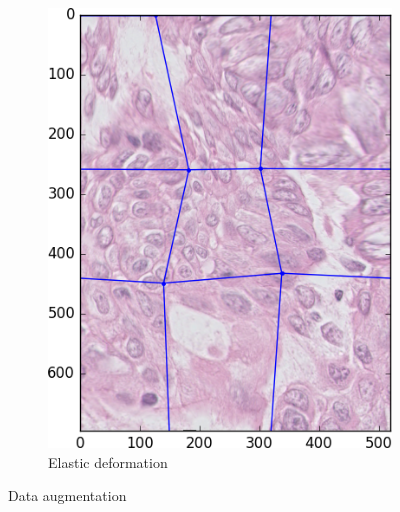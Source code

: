 \documentclass[a4paper,10pt]{article}
\begin{document}
\begin{figure}
\begin{multicols}{3}
\begin{subfigure}{0.33\textwidth}
    \includegraphics[width=\linewidth]{ELAST.png}\par 
     \caption{Elastic deformation}
     \label{fig:elastic}
	\end{subfigure}%
\end{multicols}
\caption{Data augmentation}
\end{figure}



\end{document}
